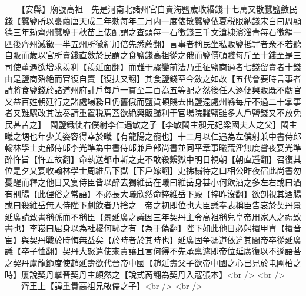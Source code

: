 　　【安縣】廟號高祖　先是河南北諸州官自賣海鹽歲收緡錢十七萬又散蠶鹽斂民錢【蠶鹽所以裛繭唐天成二年勑每年二月内一度俵散蠶鹽依夏税限納錢宋白曰周顯德三年勅齊州蠶鹽于秋苗上俵配謂之查頭每一石徵錢三千文滄棣濱淄青每石徵絹一匹後齊州減徵一半五州所徵絹加倍先悉薦翻】言事者稱民坐私販鹽抵罪者衆不若聽自販而歲以官所賣錢直斂於民謂之食鹽錢高祖從之俄而鹽價頓賤每斤至十錢至是三司使董遇欲增求羨利【羨延面翻】而難于驟變前法乃重征鹽商過者七錢留賣者十錢由是鹽商殆絶而官復自賣【復扶又翻】其食鹽錢至今斂之如故【五代會要時言事者請將食鹽錢於諸道州府計戶每戶一貫至二百為五等配之然後任人逐便興販既不虧官又益百姓朝廷行之諸處場務且仍舊俄而鹽貨頓賤去出鹽遠處州縣每斤不過二十掌事者又難驟改其法奏請重置税焉蓋欲絶興販歸利于官場院糶鹽雖多人戶鹽錢又不放免民甚苦之】　閩鹽鐵使右僕射李仁遇敏之子【李敏閩主昶元妃梁國夫人之父】閩主曦之甥也年少美姿容得幸於曦【有龍陽之寵也】十二月以仁遇為左僕射兼中書侍郎翰林學士吏部侍郎李光準為中書侍郎兼戶部尚書並同平章事曦荒淫無度嘗夜宴光準醉忤旨【忤五故翻】命執送都市斬之吏不敢殺繫獄中明日視朝【朝直遥翻】召復其位是夕又宴收翰林學士周維岳下獄【下戶嫁翻】吏拂榻待之曰相公昨夜宿此尚書勿憂醒而釋之他日又宴侍臣皆以醉去獨維岳在曦曰維岳身甚小何飲酒之多左右或曰酒有别腸【此俚俗之常語】不必長大曦欣然命捽維岳下殿【捽昨沒翻】欲剖視其酒腸或曰殺維岳無人侍陛下劇飲者乃捨之　帝之初即位也大臣議奉表稱臣告哀於契丹景延廣請致書稱孫而不稱臣【景延廣之議因三年契丹主令高祖稱兒皇帝用家人之禮致書也】李崧曰屈身以為社稷何恥之有【為于偽翻】陛下如此他日必躬擐甲胄【擐音宦】與契丹戰於時悔無益矣【於時者於其時也】延廣固争馮道依違其間帝卒從延廣議【卒子恤翻】契丹大怒遣使來責讓且言何得不先承禀遽即帝位延廣復以不遜語荅之契丹盧龍節度使趙延壽欲代晉帝中國【趙延壽父子欲帝中國之心已見於屯圑柏之時】屢說契丹擊晉契丹主頗然之【說式芮翻為契丹入寇張本】<br />
<br />
　　齊王上【諱重貴高祖兄敬儒之子】<br />
<br />
